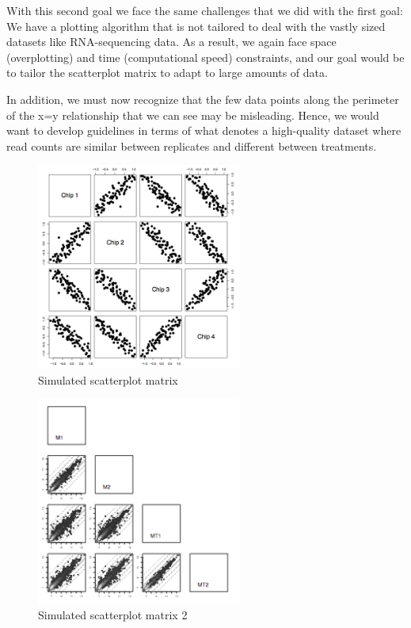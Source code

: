\documentclass[11pt,a4paper,oldfontcommands,openany]{memoir}
\numberwithin{equation}{section} %
\begin{document}
With this second goal we face the same challenges that we did with the first goal: We have a plotting algorithm that is not tailored to deal with the vastly sized datasets like RNA-sequencing data. As a result, we again face space (overplotting) and time (computational speed) constraints, and our goal would be to tailor the scatterplot matrix to adapt to large amounts of data.

In addition, we must now recognize that the few data points along the perimeter of the x=y relationship that we can see may be misleading. Hence, we would want to develop guidelines in terms of what denotes a high-quality dataset where read counts are similar between replicates and different between treatments. 

\begin{figure}[H]
    \begin{framed}
    \centering
    \includegraphics[width=0.6\textwidth]{scatmat}
    \end{framed}
    \caption{Simulated scatterplot matrix}
    \label{fig:scatmat}
\end{figure}

\begin{figure}[H]
    \begin{framed}
    \centering
    \includegraphics[width=0.6\textwidth]{scatmat2}
    \end{framed}
    \caption{Simulated scatterplot matrix 2}
    \label{fig:scatmat2}
\end{figure}
\end{document}
